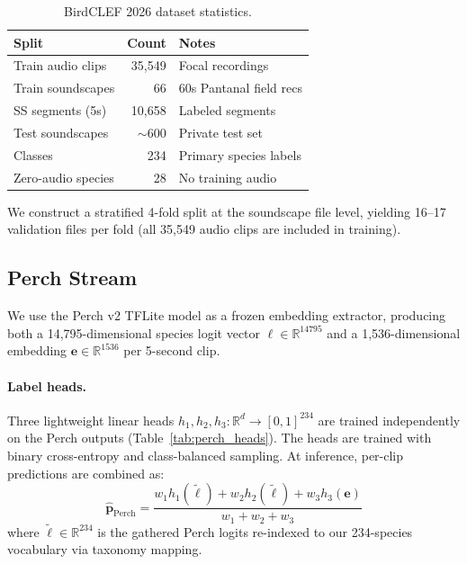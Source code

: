 \documentclass[10pt,twocolumn]{article}
\newcommand{\tabref}[1]{Table~\ref{#1}}
\begin{document}
\begin{table}[h]
\centering
\small
\caption{BirdCLEF 2026 dataset statistics.}
\label{tab:dataset}
\begin{tabular}{lrl}
\toprule
Split & Count & Notes \\
\midrule
Train audio clips  & 35,549  & Focal recordings \\
Train soundscapes  & 66      & 60s Pantanal field recs \\
SS segments (5s)   & 10,658  & Labeled segments \\
Test soundscapes   & $\sim$600 & Private test set \\
Classes            & 234     & Primary species labels \\
Zero-audio species & 28      & No training audio \\
\bottomrule
\end{tabular}
\end{table}

\noindent
We construct a stratified 4-fold split at the soundscape file level,
yielding 16--17 validation files per fold
(all 35,549 audio clips are included in training).

\subsection{Perch Stream}
\label{sec:perch}

We use the Perch v2 TFLite model as a frozen embedding extractor,
producing both a 14,795-dimensional species logit vector $\bm{\ell} \in \mathbb{R}^{14795}$
and a 1,536-dimensional embedding $\mathbf{e} \in \mathbb{R}^{1536}$ per 5-second clip.

\paragraph{Label heads.}
Three lightweight linear heads $h_1, h_2, h_3 : \mathbb{R}^{d} \to [0,1]^{234}$
are trained independently on the Perch outputs (\tabref{tab:perch_heads}).
The heads are trained with binary cross-entropy and class-balanced sampling.
At inference, per-clip predictions are combined as:
\begin{equation}
  \hat{\bm{p}}_{\text{Perch}} = \frac{w_1 h_1(\tilde{\bm{\ell}}) + w_2 h_2(\tilde{\bm{\ell}}) + w_3 h_3(\mathbf{e})}{w_1{+}w_2{+}w_3}
  \label{eq:perch_combine}
\end{equation}
where $\tilde{\bm{\ell}} \in \mathbb{R}^{234}$ is the gathered Perch logits
re-indexed to our 234-species vocabulary via taxonomy mapping.
\end{document}
